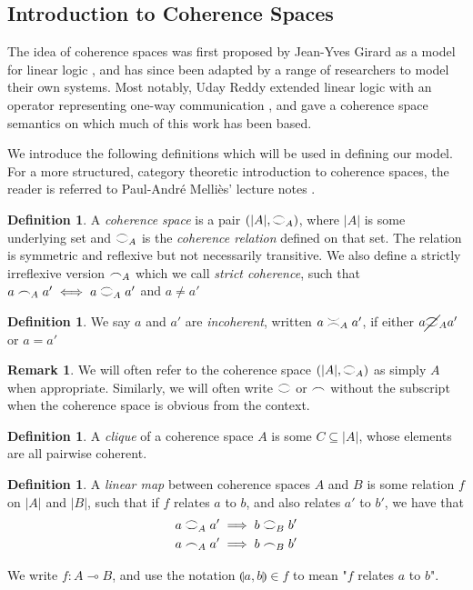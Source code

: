 \documentclass[11pt, oneside]{article}
\theoremstyle{plain}
\theoremstyle{definition}
\newtheorem{definition}[theorem]{Definition}
\newtheorem*{remark}{Remark}
\newcommand{\lp}{\llparenthesis}
\newcommand{\rp}{\rrparenthesis}
\newcommand{\coh}[1][]{\mathrel{\vcenter{\offinterlineskip\hbox{$\frown$}\vskip0.2ex\hbox{$\smile$}}_{\ifx\\#1\\\else#1\fi}}}
\newcommand{\incoh}[1][]{\mathrel{\vcenter{\offinterlineskip\hbox{$\smile$}\vskip0.2ex\hbox{$\frown$}}_{\ifx\\#1\\\else#1\fi}}}
\newcommand{\notcoh}[1][]{\cancel{\coh}_{\ifx\\#1\\\else#1\fi}}
\newcommand{\scoh}[1][]{\mathrel{\frown}_{\ifx\\#1\\\else#1\fi}}
\begin{document}
\subsection{Introduction to Coherence Spaces}
The idea of coherence spaces was first proposed by Jean-Yves Girard as a model for linear logic \cite{girard1987linear}, and has since been adapted by a range of researchers to model their own systems.
Most notably, Uday Reddy extended linear logic with an operator representing one-way communication \cite{reddy1993all}, and gave a coherence space semantics on which much of this work has been based.

We introduce the following definitions which will be used in defining our model.
For a more structured, category theoretic introduction to coherence spaces, the reader is referred to Paul-André Melliès' lecture notes \cite{mellies2000survival}.

\begin{definition}
    A \textit{coherence space} is a pair $(|A|,\coh[A])$, where $|A|$ is some underlying set and $\coh[A]$ is the \textit{coherence relation} defined on that set.
    The relation is symmetric and reflexive but not necessarily transitive.
    We also define a strictly irreflexive version $\scoh[A]$ which we call \textit{strict coherence}, such that $a\scoh[A]a' \iff a\coh[A]a'$ and $a\not=a'$
\end{definition}

\begin{definition}
    We say $a$ and $a'$ are \textit{incoherent}, written $a \incoh[A] a'$, if either $a \notcoh[A] a'$ or $a=a'$
\end{definition}

\begin{remark}
    We will often refer to the coherence space $(|A|,\coh[A])$ as simply $A$ when appropriate.
    Similarly, we will often write $\coh$ or $\scoh$ without the subscript when the coherence space is obvious from the context.
\end{remark}

\begin{definition}
    A \textit{clique} of a coherence space $A$ is some $C \subseteq |A|$, whose elements are all pairwise coherent.
\end{definition}

\begin{definition}
    A \textit{linear map} between coherence spaces $A$ and $B$ is some relation $f$ on $|A|$ and $|B|$,
    such that if $f$ relates $a$ to $b$, and also relates $a'$ to $b'$, we have that
    \begin{align*}
        a \coh[A] a' &\implies b \coh[B] b' \\
        a \scoh[A] a' &\implies b \scoh[B] b'
    \end{align*}

    We write $f:A\multimap B$, and use the notation $\lp a,b\rp\in f$ to mean "$f$ relates $a$ to $b$".
\end{definition}
\end{document}

